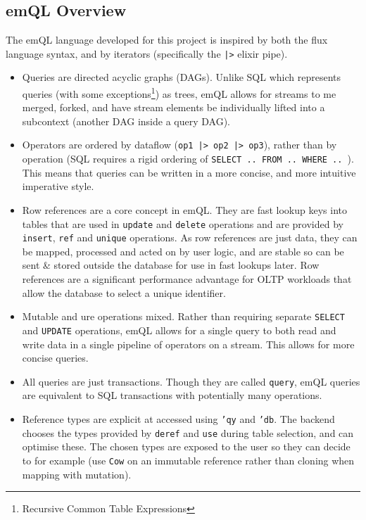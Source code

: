 \subsection{emQL Overview}
The emQL language developed for this project is inspired by both the flux language syntax, and by iterators (specifically the \texttt{|>} elixir pipe).
\begin{itemize}
    \setlength\itemsep{0em}
    \item Queries are directed acyclic graphs (DAGs). Unlike SQL which represents queries (with some exceptions\footnote{Recursive Common Table Expressions})
          as trees, emQL allows for streams to me merged, forked, and have stream elements be individually lifted
          into a subcontext (another DAG inside a query DAG).
    \item Operators are ordered by dataflow (\texttt{op1 |> op2 |> op3}), rather than by operation
          (SQL requires a rigid ordering of \texttt{SELECT .. FROM .. WHERE .. }). This means that queries
          can be written in a more concise, and more intuitive imperative style.
    \item Row references are a core concept in emQL. They are fast lookup keys into tables that are used in
          \texttt{update} and \texttt{delete} operations and are provided by \texttt{insert},
          \texttt{ref} and \texttt{unique} operations. As row references are just data, they can be mapped,
          processed and acted on by user logic, and are stable so can be sent \& stored outside the database for use in fast
          lookups later. Row references are a significant performance advantage for OLTP workloads that allow the database to
          select a unique identifier.
    \item Mutable and ure operations mixed. Rather than requiring separate \texttt{SELECT} and \texttt{UPDATE}
          operations, emQL allows for a single query to both read and write data in a single pipeline of operators on a stream.
          This allows for more concise queries.
    \item All queries are just transactions. Though they are called \texttt{query}, emQL queries are equivalent to SQL
          transactions with potentially many operations.
    \item Reference types are explicit at accessed using \texttt{'qy} and \texttt{'db}. The backend chooses the types provided by \texttt{deref} and \texttt{use}
          during table selection, and can optimise these. The chosen types are exposed to the user so they can decide to for example (use
          \texttt{Cow} on an immutable reference rather than cloning when mapping with mutation).
\end{itemize}
